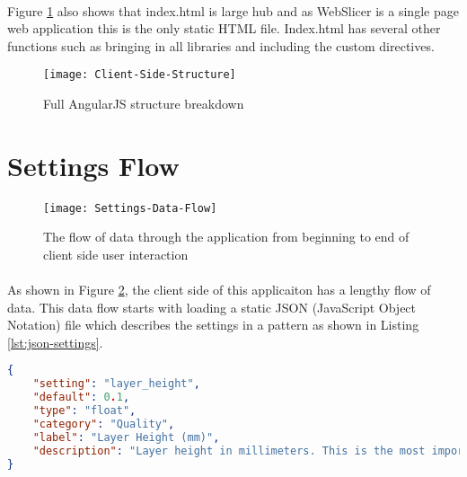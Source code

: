 \paragraph{}%
Figure \ref{fig:client-side-structure} also shows that index.html is large hub and as WebSlicer is a single page web application this is the only static HTML file.
Index.html has several other functions such as bringing in all libraries and including the custom directives.



\begin{figure}[!ht]
  \centering
  \texttt{[image: Client-Side-Structure]}
  \caption{Full AngularJS structure breakdown}
  \label{fig:client-side-structure}
\end{figure}

\section{Settings Flow}
\paragraph{}

\begin{figure}[!ht]
  \centering
  \texttt{[image: Settings-Data-Flow]}
  \caption{The flow of data through the application from beginning to end of client side user interaction}
  \label{fig:settings-data-flow}
\end{figure}

\paragraph{}
As shown in Figure \ref{fig:settings-data-flow}, the client side of this applicaiton has a lengthy flow of data.
This data flow starts with loading a static JSON (JavaScript Object Notation) file which describes the settings in a pattern as shown in Listing \ref{lst:json-settings}.

\begin{lstlisting}[language=json, label={lst:json-settings}, caption=A sample from a static settings file in JSON format.]
{
    "setting": "layer_height",
    "default": 0.1,
    "type": "float",
    "category": "Quality",
    "label": "Layer Height (mm)",
    "description": "Layer height in millimeters. This is the most important setting to determine the quality of your print. Normal quality prints are 0.1mm, high quality is 0.06mm. You can go up to 0.25mm."
}
\end{lstlisting}

